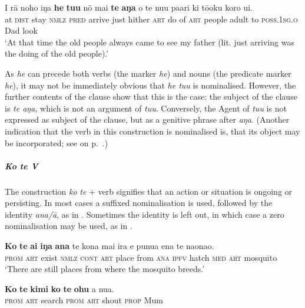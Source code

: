 \ea\label{ex:3.23}
\gll {\ꞌ}I rā noho iŋa \textbf{he} \textbf{tu{\ꞌ}u} nō mai \textbf{te} \textbf{aŋa} o te nu{\ꞌ}u pa{\ꞌ}ari ki tō{\ꞌ}oku koro u{\ꞌ}i.\\
at \textsc{dist} stay \textsc{nmlz} \textsc{pred} arrive just hither \textsc{art} do of \textsc{art} people adult to \textsc{poss.1sg.o} Dad look\\

\glt
‘At that time the old people always came to see my father (lit. just arriving was the doing of the old people).’ \textstyleExampleref{[R649.101]} 
\z

As \textit{he} can precede both verbs (the  marker \textit{he}) and nouns (the predicate marker \textit{he}), it may not be immediately obvious that \textit{he tu{\ꞌ}u} is nominalised. However, the further contents of the clause show that this is the case: the subject of the clause is \textit{te aŋa}, which is not an argument of \textit{tu{\ꞌ}u}. Conversely, the Agent of \textit{tu{\ꞌ}u} is not expressed as subject of the clause, but as a genitive phrase after \textit{aŋa}. (Another indication that the verb in this construction is nominalised is, that its object may be incorporated; see  on p.~\pageref{ex:5.128}.)

\subparagraph{\textit{Ko te V}} The construction \textit{ko} \textit{te} + verb signifies that an action or situation is ongoing or persisting. In most cases a suffixed nominalisation is used, followed by the identity  \textit{{\ꞌ}ana}\textit{/{\ꞌ}ā}, as in . Sometimes the identity  is left out, in which case a zero nominalisation may be used, as in . 

\ea\label{ex:3.24}
\gll \textbf{Ko} \textbf{te} \textbf{ai} \textbf{iŋa} \textbf{{\ꞌ}ana} te kona mai ira e punua ena te naonao. \\
\textsc{prom} \textsc{art} exist \textsc{nmlz} \textsc{cont} \textsc{art} place from \textsc{ana} \textsc{ipfv} hatch \textsc{med} \textsc{art} mosquito \\

\glt 
‘There are still places from where the mosquito breeds.’ \textstyleExampleref{[R535.054]} 
\z

\ea\label{ex:3.25}
\gll \textbf{Ko} \textbf{te} \textbf{kimi} \textbf{ko} \textbf{te} \textbf{ohu} a nua. \\
\textsc{prom} \textsc{art} search \textsc{prom} \textsc{art} shout \textsc{prop} Mum \\

